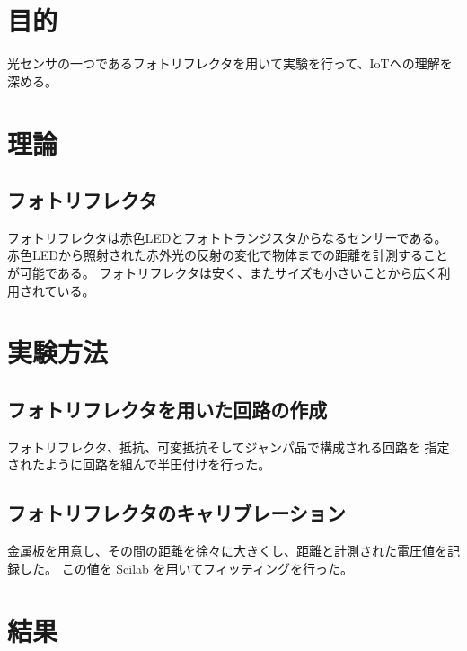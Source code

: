 \documentclass[11pt,a4j]{jsarticle}
\begin{document}


\section{目的}

光センサの一つであるフォトリフレクタを用いて実験を行って、IoTへの理解を深める。

\section{理論}
\label{sec:理論}

\subsection{フォトリフレクタ}
\label{sub:フォトリフレクタ}
フォトリフレクタは赤色LEDとフォトトランジスタからなるセンサーである。
赤色LEDから照射された赤外光の反射の変化で物体までの距離を計測することが可能である。
フォトリフレクタは安く、またサイズも小さいことから広く利用されている。


\section{実験方法}
\label{sec:実験方法}

\subsection{フォトリフレクタを用いた回路の作成}
\label{sub:フォトリフレクタを用いた回路の作成}

フォトリフレクタ、抵抗、可変抵抗そしてジャンパ品で構成される回路を
指定されたように回路を組んで半田付けを行った。

\subsection{フォトリフレクタのキャリブレーション}
\label{sub:フォトリフレクタのキャリブレーション}

金属板を用意し、その間の距離を徐々に大きくし、距離と計測された電圧値を記録した。
この値を Scilab を用いてフィッティングを行った。

\section{結果}
\label{sec:結果}
\end{document}
